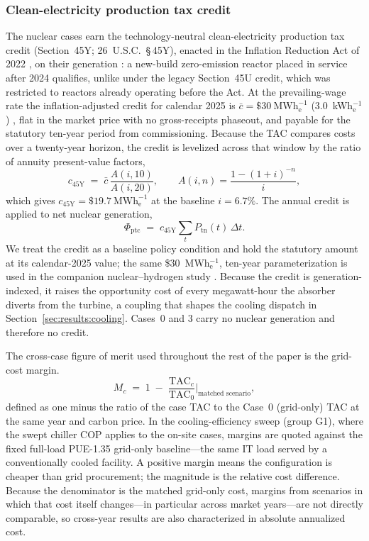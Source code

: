 \documentclass[a4paper,fleqn]{cas-sc}
\begin{document}
\subsubsection{Clean-electricity production tax credit}
The nuclear cases earn the technology-neutral clean-electricity production tax credit (Section~45Y; 26~U.S.C.~\S\,45Y), enacted in the Inflation Reduction Act of 2022 \citep{ira2022}, on their generation \citep{usc26_45y,irs45y}: a new-build zero-emission reactor placed in service after 2024 qualifies, unlike under the legacy Section~45U credit, which was restricted to reactors already operating before the Act. At the prevailing-wage rate the inflation-adjusted credit for calendar 2025 is $\bar{c}=\$30~\mathrm{MWh}_\mathrm{e}^{-1}$ (3.0\textcent~kWh$_\mathrm{e}^{-1}$) \citep{fr2025_45y}, flat in the market price with no gross-receipts phaseout, and payable for the statutory ten-year period from commissioning. Because the TAC compares costs over a twenty-year horizon, the credit is levelized across that window by the ratio of annuity present-value factors,
\begin{equation}
\label{eq:ptc}
c_{45\mathrm{Y}} \;=\; \bar{c}\,\frac{A(i,10)}{A(i,20)}, \qquad A(i,n)=\frac{1-(1+i)^{-n}}{i},
\end{equation}
which gives $c_{45\mathrm{Y}}=\$19.7~\mathrm{MWh}_\mathrm{e}^{-1}$ at the baseline $i=6.7\%$. The annual credit is applied to net nuclear generation,
\begin{equation}
\label{eq:ptc_total}
\Phi_\mathrm{ptc} \;=\; c_{45\mathrm{Y}} \sum_t P_\mathrm{tn}(t)\,\Delta t.
\end{equation}
We treat the credit as a baseline policy condition and hold the statutory amount at its calendar-2025 value; the same \$30~MWh$_\mathrm{e}^{-1}$, ten-year parameterization is used in the companion nuclear--hydrogen study \citep{li2026nuclearH2}. Because the credit is generation-indexed, it raises the opportunity cost of every megawatt-hour the absorber diverts from the turbine, a coupling that shapes the cooling dispatch in Section~\ref{sec:results:cooling}. Cases~0 and 3 carry no nuclear generation and therefore no credit.

The cross-case figure of merit used throughout the rest of the paper is the grid-cost margin.
\begin{equation}
\label{eq:margin}
M_c \;=\; 1 \;-\; \frac{\mathrm{TAC}_c}{\mathrm{TAC}_0}\Big|_{\text{matched scenario}},
\end{equation}
defined as one minus the ratio of the case TAC to the Case~0 (grid-only) TAC at the same year and carbon price. In the cooling-efficiency sweep (group G1), where the swept chiller COP applies to the on-site cases, margins are quoted against the fixed full-load PUE-1.35 grid-only baseline---the same IT load served by a conventionally cooled facility. A positive margin means the configuration is cheaper than grid procurement; the magnitude is the relative cost difference. Because the denominator is the matched grid-only cost, margins from scenarios in which that cost itself changes---in particular across market years---are not directly comparable, so cross-year results are also characterized in absolute annualized cost.
\end{document}
